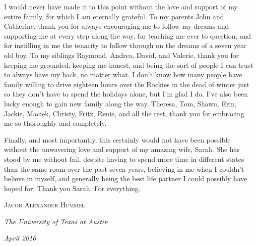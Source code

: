 \documentclass[12pt,double]{thesis}
\begin{document}
\begin{UTacknowledgements}
I would never have made it to this point without the love and support of my entire family, for which I am eternally grateful.  To my parents John and Catherine, thank you for always encouraging me to follow my dreams and supporting me at every step along the way, for teaching me ever to question, and for instilling in me the tenacity to follow through on the dreams of a seven year old boy.  To my siblings Raymond, Andrea, David, and Valerie, thank you for keeping me grounded, keeping me honest, and being the sort of people I can trust to always have my back, no matter what.  I don't know how many people have family willing to drive eighteen hours over the Rockies in the dead of winter just so they don't have to spend the holidays alone, but I'm glad I do. I've also been lucky enough to gain new family along the way.  Theresa, Tom, Shawn, Erin, Jackie, Maciek, Christy, Fritz, Renie, and all the rest, thank you for embracing me so thoroughly and completely.

Finally, and most importantly, this certainly would not have been possible without the unwavering love and support of my amazing wife, Sarah. She has stood by me without fail, despite having to spend more time in different states than the same room over the past seven years, believing in me when I couldn't believe in myself, and generally being the best life partner I could possibly have hoped for.  Thank you Sarah. For everything.

\begin{flushright}
\textsc{Jacob Alexander Hummel}
\end{flushright}

\begin{flushleft}
\textit{The University of Texas at Austin}

\textit{April 2016}
\end{flushleft}


\end{UTacknowledgements}
\end{document}
